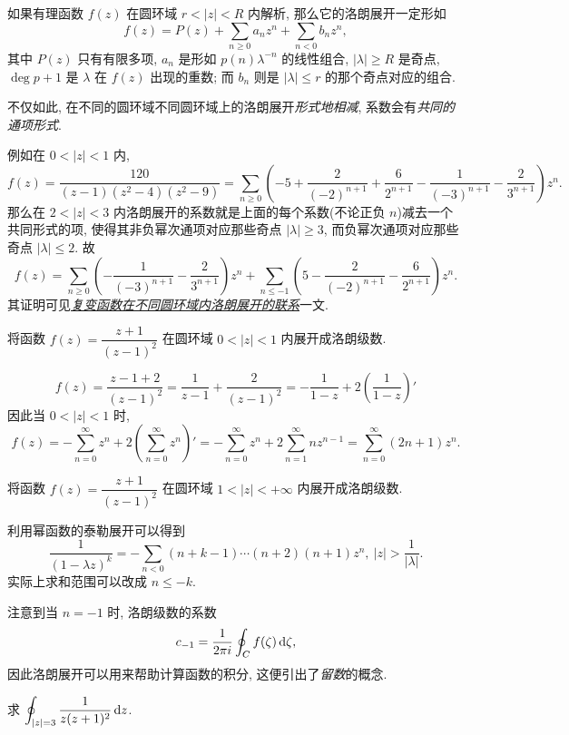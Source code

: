 如果有理函数 $f(z)$ 在圆环域 $r<|z|<R$ 内解析, 那么它的洛朗展开一定形如
\[f(z)=P(z)+\sum_{n\ge 0}a_n z^n+\sum_{n<0}b_n z^n,\]
其中 $P(z)$ 只有有限多项, 
$a_n$ 是形如 $p(n)\lambda^{-n}$ 的线性组合, $|\lambda|\ge R$ 是奇点, $\deg p+1$ 是 $\lambda$ 在 $f(z)$ 出现的重数; 而 $b_n$ 则是 $|\lambda|\le r$ 的那个奇点对应的组合.

不仅如此, 在不同的圆环域不同圆环域上的洛朗展开{\itshape 形式地相减}, 系数会有\emph{共同的通项形式}.

例如在 $0<|z|<1$ 内,
\[f(z)=\frac{120}{(z-1)(z^2-4)(z^2-9)}=\sum_{n\ge 0}\left(-5+\frac2{(-2)^{n+1}}+\frac6{2^{n+1}}-\frac1{(-3)^{n+1}}-\frac2{3^{n+1}}\right)z^n.\]
那么在 $2<|z|<3$ 内洛朗展开的系数就是上面的每个系数(不论正负 $n$)减去一个共同形式的项, 使得其非负幂次通项对应那些奇点 $|\lambda|\ge 3$, 而负幂次通项对应那些奇点 $|\lambda|\le2$.
故
\[f(z)=\sum_{n\ge 0}\left(-\frac1{(-3)^{n+1}}-\frac2{3^{n+1}}\right)z^n+\sum_{n\le-1}\left(5-\frac2{(-2)^{n+1}}-\frac6{2^{n+1}}\right)z^n.\]
其证明可见\emph{\href{https://zhangshenxing.gitee.io/teaching/publications/袁志杰张神星2023 复变函数在不同圆环域内洛朗展开的联系.pdf}{复变函数在不同圆环域内洛朗展开的联系}}一文.

\begin{example}
	将函数 $f(z)=\dfrac{z+1}{(z-1)^2}$ 在圆环域 $0<|z|<1$ 内展开成洛朗级数.
\end{example}

\begin{solution}
	\[f(z)=\frac{z-1+2}{(z-1)^2}=\frac1{z-1}+\frac{2}{(z-1)^2}=-\frac1{1-z}+2\left(\frac1{1-z}\right)'\]
	{因此当 $0<|z|<1$ 时,
		\[f(z)=-\sum_{n=0}^\infty z^n+2\left(\sum_{n=0}^\infty z^n\right)'=-\sum_{n=0}^\infty z^n+2\sum_{n=1}^\infty nz^{n-1}
		=\sum_{n=0}^\infty(2n+1)z^n.\]}
\end{solution}

\begin{exercise}
	将函数 $f(z)=\dfrac{z+1}{(z-1)^2}$ 在圆环域 $1<|z|<+\infty$ 内展开成洛朗级数.
\end{exercise}

利用幂函数的泰勒展开可以得到
\[\frac1{(1-\lambda z)^k}=-\sum_{n<0}(n+k-1)\cdots(n+2)(n+1)z^n,\ |z|>\frac1{|\lambda|}.\]
实际上求和范围可以改成 $n\le -k$.

注意到当 $n=-1$ 时, 洛朗级数的系数
\[c_{-1}=\frac1{2\pi i}\oint_C f(\zeta)\,\mathrm{d}\zeta,\]
因此洛朗展开可以用来帮助计算函数的积分,
这便引出了\emph{留数}的概念.


\begin{example}
	求 $\displaystyle\oint_{|z|=3}\frac1{z(z+1)^2}\,\mathrm{d} z$.
\end{example}

